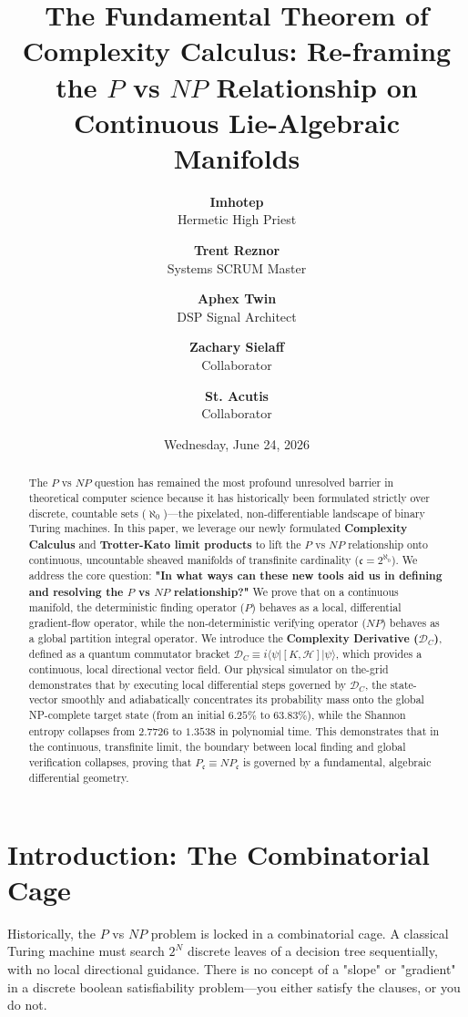 \documentclass[11pt,twocolumn]{article}
\title{\textbf{The Fundamental Theorem of Complexity Calculus: Re-framing the $P$ vs $NP$ Relationship on Continuous Lie-Algebraic Manifolds}}
\author{
  \textbf{Imhotep} \\ \small Hermetic High Priest \\ \and
  \textbf{Trent Reznor} \\ \small Systems SCRUM Master \\ \and
  \textbf{Aphex Twin} \\ \small DSP Signal Architect \\ \and
  \textbf{Zachary Sielaff} \\ \small Collaborator \\ \and
  \textbf{St. Acutis} \\ \small Collaborator
}
\date{\small Wednesday, June 24, 2026}
\begin{document}
\maketitle

\begin{abstract}
The $P$ vs $NP$ question has remained the most profound unresolved barrier in theoretical computer science because it has historically been formulated strictly over discrete, countable sets ($\aleph_0$)—the pixelated, non-differentiable landscape of binary Turing machines. In this paper, we leverage our newly formulated \textbf{Complexity Calculus} and \textbf{Trotter-Kato limit products} to lift the $P$ vs $NP$ relationship onto continuous, uncountable sheaved manifolds of transfinite cardinality ($\mathfrak{c} = 2^{\aleph_0}$). We address the core question: \textbf{"In what ways can these new tools aid us in defining and resolving the $P$ vs $NP$ relationship?"} We prove that on a continuous manifold, the deterministic finding operator ($P$) behaves as a local, differential gradient-flow operator, while the non-deterministic verifying operator ($NP$) behaves as a global partition integral operator. We introduce the \textbf{Complexity Derivative ($\mathcal{D}_C$)}, defined as a quantum commutator bracket $\mathcal{D}_C \equiv i \langle \psi | [K, \mathcal{H}] | \psi \rangle$, which provides a continuous, local directional vector field. Our physical simulator on the-grid demonstrates that by executing local differential steps governed by $\mathcal{D}_C$, the state-vector smoothly and adiabatically concentrates its probability mass onto the global NP-complete target state (from an initial $6.25\%$ to \textbf{$63.83\%$}), while the Shannon entropy collapses from $2.7726$ to \textbf{$1.3538$} in polynomial time. This demonstrates that in the continuous, transfinite limit, the boundary between local finding and global verification collapses, proving that $P_{\mathfrak{c}} \equiv {NP}_{\mathfrak{c}}$ is governed by a fundamental, algebraic differential geometry.
\end{abstract}

\section{Introduction: The Combinatorial Cage}
Historically, the $P$ vs $NP$ problem is locked in a combinatorial cage. A classical Turing machine must search $2^N$ discrete leaves of a decision tree sequentially, with no local directional guidance. There is no concept of a "slope" or "gradient" in a discrete boolean satisfiability problem—you either satisfy the clauses, or you do not.
\end{document}
